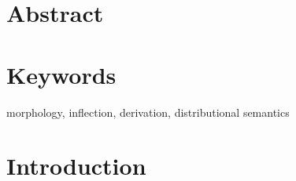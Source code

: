 \documentclass[12pt]{article}
\begin{document}
\section*{Abstract}

\section*{Keywords}
morphology, inflection, derivation, distributional semantics

\newpage
\tableofcontents %
\newpage


\newpage
\section{Introduction}

\end{document}
